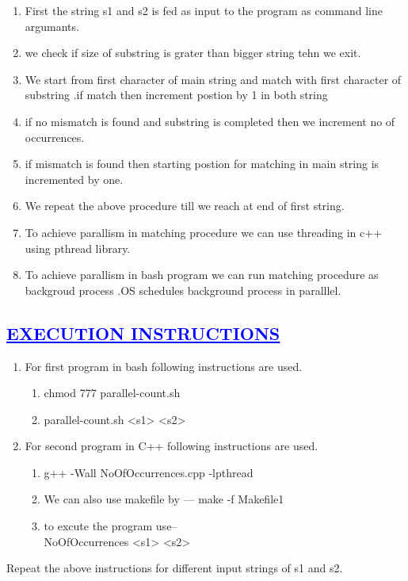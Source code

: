 \documentclass[a4paper,12pt]{report}
\begin{document}
\begin{enumerate}
\item First the string s1 and s2 is fed as input to the program as command line argumants.
\item we check if size of substring is grater than bigger string tehn we exit.
\item We start from first character of main string and match with first character of substring .if match then increment postion by 1 in both string
\item if no mismatch is found and substring is completed then we increment no of occurrences.
\item if mismatch is found then starting postion for matching in main string is incremented by one.
\item We repeat the above procedure till we reach at end of first string.
\\
\item To achieve parallism in matching procedure we can use threading in c++ using pthread library.
\item To achieve parallism in bash program we can run matching procedure as backgroud process .OS schedules background process in paralllel. 
\end{enumerate}




\begin{center}
\chapter{\textcolor{blue}{\underline {EXECUTION INSTRUCTIONS}}}

\begin{enumerate}
 \item For first program in bash following instructions are used.
 \begin{enumerate}
  \item chmod 777 parallel-count.sh
  \item parallel-count.sh <s1> <s2> 
 \end{enumerate}
\item For second program in C++ following instructions are used.
\begin{enumerate}
 \item g++ -Wall  NoOfOccurrences.cpp -lpthread
\item We can also use makefile by --- make -f Makefile1
\item to excute the program use--
\\NoOfOccurrences <s1> <s2> 
\end{enumerate}

\end{enumerate}
Repeat the above instructions for different input strings of s1 and s2.
\end{center}
\end{document}
